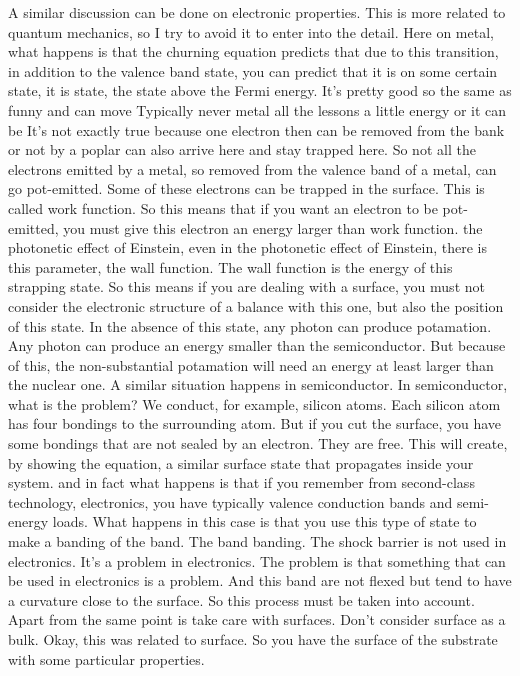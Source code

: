 A similar discussion can be done on electronic properties. This is more related to quantum mechanics, so I try to avoid it to enter into the detail. Here on metal, what happens is that the churning equation predicts that due to this transition, in addition to the valence band state, you can predict that it is on some certain state, it is state, the state above the Fermi energy. It's pretty good so the same as funny and can move Typically never metal all the lessons a little energy or it can be It's not exactly true because one electron then can be removed from the bank or not by a poplar can also arrive here and stay trapped here. So not all the electrons emitted by a metal, so removed from the valence band of a metal, can go pot-emitted. Some of these electrons can be trapped in the surface. This is called work function. So this means that if you want an electron to be pot-emitted, you must give this electron an energy larger than work function. the photonetic effect of Einstein, even in the photonetic effect of Einstein, there is this parameter, the wall function. The wall function is the energy of this strapping state. So this means if you are dealing with a surface, you must not consider the electronic structure of a balance with this one, but also the position of this state. In the absence of this state, any photon can produce potamation. Any photon can produce an energy smaller than the semiconductor. But because of this, the non-substantial potamation will need an energy at least larger than the nuclear one. A similar situation happens in semiconductor. In semiconductor, what is the problem? We conduct, for example, silicon atoms. Each silicon atom has four bondings to the surrounding atom. But if you cut the surface, you have some bondings that are not sealed by an electron. They are free. This will create, by showing the equation, a similar surface state that propagates inside your system. and in fact what happens is that if you remember from second-class technology, electronics, you have typically valence conduction bands and semi-energy loads. What happens in this case is that you use this type of state to make a banding of the band. The band banding. The shock barrier is not used in electronics. It's a problem in electronics. The problem is that something that can be used in electronics is a problem. And this band are not flexed but tend to have a curvature close to the surface. So this process must be taken into account. Apart from the same point is take care with surfaces. Don't consider surface as a bulk. Okay, this was related to surface. So you have the surface of the substrate with some particular properties.
